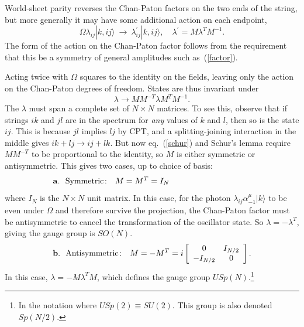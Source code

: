 \documentclass[12pt]{article}
\def\be{\begin{equation}}
\def\ee{\end{equation}}
\begin{document}
World-sheet parity reverses the Chan-Paton factors on the two ends of the
string, but more generally it may have some additional action on each
endpoint,
\be
\Omega\lambda_{ij}|{ k},ij \rangle\ \to\
\lambda^\prime_{ij} |{ k},ij \rangle, \quad
\lambda^\prime= M \lambda^{T} M^{-1}.
\ee
The form of the action on the Chan-Paton factor follows from the requirement
that this be a symmetry of general amplitudes such as~(\ref{factor}).

Acting twice with $\Omega$ squares to the identity on the fields, leaving
only the action on the Chan-Paton degrees of freedom. States are thus
invariant under 
\be
\lambda\to MM^{-T}\lambda M^TM^{-1}. \label{schur}
\ee  
The $\lambda$ must span a complete set of $N \times N$ matrices.  To see
this, observe that if strings $ik$ and $jl$ are in the spectrum for {\it any}
values of $k$ and
$l$, then so is the state $ij$.  This is because $jl$ implies $lj$ by CPT, and
a splitting-joining interaction in the middle gives $ik + lj \to ij + lk$.
But now eq.~(\ref{schur}) and Schur's lemma require $MM^{-T}$ to be
proportional to the identity,
so $M$ is either symmetric or antisymmetric.
This gives
two cases, up to choice of basis:\, \cite{sms}
\be
{\bf a.\ \ }{\rm Symmetric\colon}\ \ M=M^T=I_N
\qquad\qquad\qquad\qquad\qquad
\ee 
where $I_N$ is the $N\times N$ unit matrix.  In this case, for the photon
$\lambda_{ij}\alpha^\mu_{-1}|{ k}\rangle$ to be even under $\Omega$ and
therefore survive the projection, the Chan-Paton factor must be antisymmetric
to cancel the transformation of the oscillator state.  So
$\lambda=-\lambda^T$, giving the gauge group is $SO(N)$.
\be
{\bf b.\ \ }{\rm Antisymmetric\colon}
\ \ M=-M^T=i\left[ \begin{array}{cc}
0&I_{N/2}\\ -I_{N/2}&0 \end{array}\right].
\ee
In this case, $\lambda=-M\lambda^TM$, which defines the gauge
group $USp(N)$.\footnote{In the notation where $USp(2)\equiv SU(2)$.  This
group is also denoted $Sp(N/2)$.}
\end{document}
